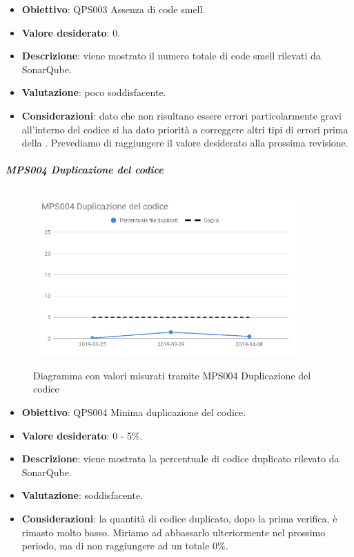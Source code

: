 	\begin{itemize}
		\item \textbf{Obiettivo}: QPS003 Assenza di code smell.
		\item \textbf{Valore desiderato}: 0.
		\item \textbf{Descrizione}: viene mostrato il numero totale di code smell rilevati da SonarQube.
		\item \textbf{Valutazione}: poco soddisfacente.
		\item \textbf{Considerazioni}: dato che non risultano essere errori particolarmente gravi all'interno del codice si ha dato priorità a correggere altri tipi di errori prima della \RQ. Prevediamo di raggiungere il valore
		desiderato alla prossima revisione.
	\end{itemize}
	
	\subparagraph{MPS004 Duplicazione del codice}
	
	\begin{figure}[H]
		\centering
		\includegraphics[width=0.9\textwidth]{img/cruscotti/RQ/MPS004.png}
		\label{immaginePresenzaDupplicazioneCodiceRQ}
		\caption{Diagramma con valori misurati tramite MPS004 Duplicazione del codice}
	\end{figure}
	
	\begin{itemize}
		\item \textbf{Obiettivo}: QPS004 Minima duplicazione del codice.
		\item \textbf{Valore desiderato}: 0 - 5\%.
		\item \textbf{Descrizione}: viene mostrata la percentuale di codice duplicato rilevato da SonarQube.
		\item \textbf{Valutazione}: soddisfacente.
		\item \textbf{Considerazioni}: la quantità di codice duplicato, dopo la prima verifica, è rimasto molto basso. Miriamo ad abbassarlo ulteriormente nel prossimo periodo, ma di non raggiungere ad un totale 0\%.
	\end{itemize}


